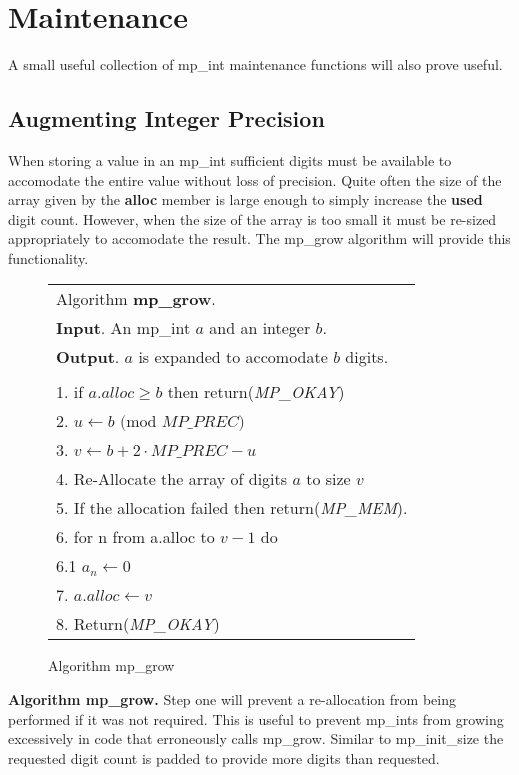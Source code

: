 \documentclass[b5paper]{book}
\begin{document}
\section{Maintenance}
A small useful collection of mp\_int maintenance functions will also prove useful.  

\subsection{Augmenting Integer Precision}
When storing a value in an mp\_int sufficient digits must be available to accomodate the entire value without
loss of precision.  Quite often the size of the array given by the \textbf{alloc} member is large enough to simply
increase the \textbf{used} digit count.  However, when the size of the array is too small it must be re-sized 
appropriately to accomodate the result.  The mp\_grow algorithm will provide this functionality.

\begin{figure}[here]
\begin{center}
\begin{tabular}{l}
\hline Algorithm \textbf{mp\_grow}. \\
\textbf{Input}.   An mp\_int $a$ and an integer $b$. \\
\textbf{Output}.  $a$ is expanded to accomodate $b$ digits. \\
\hline \\
1.  if $a.alloc \ge b$ then return(\textit{MP\_OKAY}) \\
2.  $u \leftarrow b\mbox{ (mod }MP\_PREC\mbox{)}$ \\
3.  $v \leftarrow b + 2 \cdot MP\_PREC - u$ \\
4.  Re-Allocate the array of digits $a$ to size $v$ \\
5.  If the allocation failed then return(\textit{MP\_MEM}). \\
6.  for n from a.alloc to $v - 1$ do  \\
\hspace{+3mm}6.1  $a_n \leftarrow 0$ \\
7.  $a.alloc \leftarrow v$ \\
8.  Return(\textit{MP\_OKAY}) \\
\hline
\end{tabular}
\end{center}
\caption{Algorithm mp\_grow}
\end{figure}

\textbf{Algorithm mp\_grow.}
Step one will prevent a re-allocation from being performed if it was not required.  This is useful to prevent mp\_ints
from growing excessively in code that erroneously calls mp\_grow.  Similar to mp\_init\_size the requested digit count
is padded to provide more digits than requested.  
\end{document}
